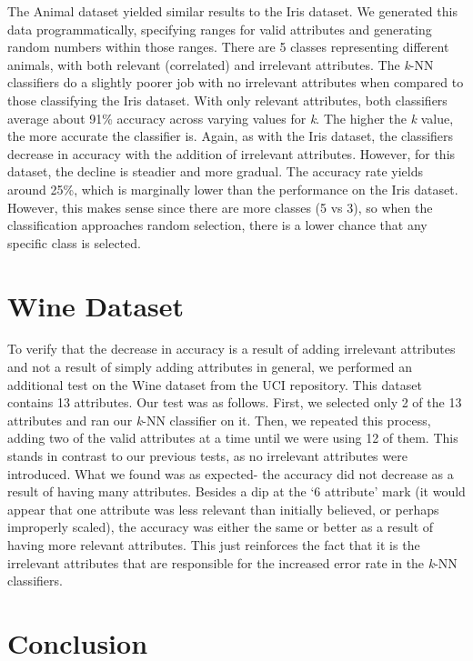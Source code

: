 \documentclass{article}
\begin{document}
The Animal dataset yielded similar results to the Iris dataset. We generated this data programmatically, specifying ranges for valid attributes and generating random numbers within those ranges. There are 5 classes representing different animals, with both relevant (correlated) and irrelevant attributes. The \textit{k}-NN classifiers do a slightly poorer job with no irrelevant attributes when compared to those classifying the Iris dataset. With only relevant attributes, both classifiers average about 91\% accuracy across varying values for \textit{k}. The higher the \textit{k} value, the more accurate the classifier is. Again, as with the Iris dataset, the classifiers decrease in accuracy with the addition of irrelevant attributes. However, for this dataset, the decline is steadier and more gradual. The accuracy rate yields around 25\%, which is marginally lower than the performance on the Iris dataset. However, this makes sense since there are more classes (5 vs 3), so when the classification approaches random selection, there is a lower chance that any specific class is selected.

\section{Wine Dataset}

To verify that the decrease in accuracy is a result of adding irrelevant attributes and not a result of simply adding attributes in general, we performed an additional test on the Wine dataset from the UCI repository. This dataset contains 13 attributes. Our test was as follows. First, we selected only 2 of the 13 attributes and ran our \textit{k}-NN classifier on it. Then, we repeated this process, adding two of the valid attributes at a time until we were using 12 of them. This stands in contrast to our previous tests, as no irrelevant attributes were introduced. What we found was as expected- the accuracy did not decrease as a result of having many attributes. Besides a dip at the ‘6 attribute’ mark (it would appear that one attribute was less relevant than initially believed, or perhaps improperly scaled), the accuracy was either the same or better as a result of having more relevant attributes. This just reinforces the fact that it is the irrelevant attributes that are responsible for the increased error rate in the \textit{k}-NN classifiers.

\section{Conclusion}
\end{document}
